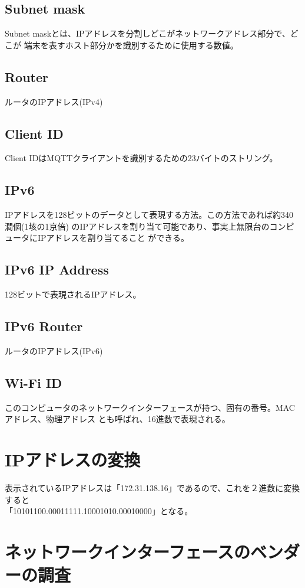 \documentclass[dvipdfmx,autodetect-engine,titlepage]{jsarticle}
\begin{document}
 \subsection{Subnet mask}
 Subnet maskとは、IPアドレスを分割しどこがネットワークアドレス部分で、どこが
 端末を表すホスト部分かを識別するために使用する数値。

 \subsection{Router}
 ルータのIPアドレス(IPv4)


 \subsection{Client ID}
 Client IDはMQTTクライアントを識別するための23バイトのストリング。

 \subsection{IPv6}
 IPアドレスを128ビットのデータとして表現する方法。この方法であれば約340澗個(1垓の1京倍)
 のIPアドレスを割り当て可能であり、事実上無限台のコンピュータにIPアドレスを割り当てること
 ができる。

 \subsection{IPv6 IP Address}
 128ビットで表現されるIPアドレス。

 \subsection{IPv6 Router}
 ルータのIPアドレス(IPv6)

 \subsection{Wi-Fi ID}
 このコンピュータのネットワークインターフェースが持つ、固有の番号。MACアドレス、物理アドレス
 とも呼ばれ、16進数で表現される。

\section{IPアドレスの変換}
表示されているIPアドレスは「172.31.138.16」であるので、これを２進数に変換すると\\
「10101100.00011111.10001010.00010000」となる。

\section{ネットワークインターフェースのベンダーの調査}
\end{document}

